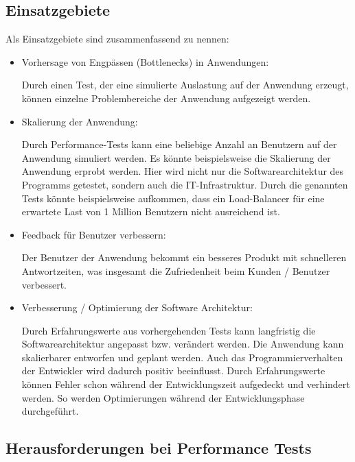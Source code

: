 \subsection{Einsatzgebiete}

Als Einsatzgebiete sind zusammenfassend zu nennen:

\begin{itemize}
    \item Vorhersage von Engpässen (Bottlenecks) in Anwendungen:
   
    Durch einen Test, der eine simulierte Auslastung auf der Anwendung erzeugt, können einzelne Problembereiche der Anwendung aufgezeigt werden.
    
    \item Skalierung der Anwendung:

    Durch Performance-Tests kann eine beliebige Anzahl an Benutzern auf der Anwendung simuliert werden. Es könnte beispielsweise die Skalierung der Anwendung erprobt werden. Hier wird nicht nur die Softwarearchitektur des Programms getestet, sondern auch die IT-Infrastruktur. Durch die genannten Tests könnte beispielsweise aufkommen, dass ein Load-Balancer für eine erwartete Last von 1 Million Benutzern nicht ausreichend ist.
    
    \item Feedback für Benutzer verbessern:
    
    Der Benutzer der Anwendung bekommt ein besseres Produkt mit schnelleren Antwortzeiten, was insgesamt die Zufriedenheit beim Kunden / Benutzer verbessert.    
    
    \item Verbesserung / Optimierung der Software Architektur:
    
    Durch Erfahrungswerte aus vorhergehenden Tests kann langfristig die Softwarearchitektur angepasst bzw. verändert werden. Die Anwendung kann skalierbarer entworfen und geplant werden. Auch das Programmierverhalten der Entwickler wird dadurch positiv beeinflusst. Durch Erfahrungswerte können Fehler schon während der Entwicklungszeit aufgedeckt und verhindert werden. So werden Optimierungen während der Entwicklungsphase durchgeführt. 

\end{itemize}

\subsection{Herausforderungen bei Performance Tests}

